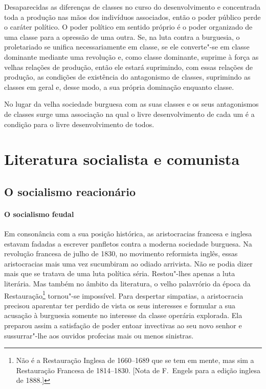 Desaparecidas as diferenças de classes no curso do desenvolvimento e
concentrada toda a produção nas mãos dos indivíduos associados, então o
poder público perde o caráter político. O poder político em sentido
próprio é o poder organizado de uma classe para a opressão de uma
outra. Se, na luta contra a burguesia, o proletariado se unifica
necessariamente em classe, se ele converte"-se em classe dominante
mediante uma revolução e, como classe dominante, suprime à força as
velhas relações de produção, então ele estará suprimindo, com essas
relações de produção, as condições de existência do antagonismo de
classes, suprimindo as classes em geral e, desse modo, a sua própria
dominação enquanto classe.

No lugar da velha sociedade burguesa com as suas classes e os seus
antagonismos de classes surge uma associação na qual o livre
desenvolvimento de cada um é a condição para o livre desenvolvimento de
todos.

\section{Literatura socialista e comunista}

\subsection{O socialismo reacionário}

\paragraph{O socialismo feudal}
Em consonância com a sua posição histórica, as aristocracias
francesa e inglesa estavam fadadas a escrever panfletos contra a
moderna sociedade burguesa. Na revolução francesa de julho de 1830, no
movimento reformista inglês, essas aristocracias mais uma vez				
sucumbiram ao odiado arrivista. Não se podia dizer mais que se tratava
de uma luta política séria. Restou"-lhes apenas a luta literária. Mas
também no âmbito da literatura, o velho palavrório da época da
Restauração\footnote{ Não é a Restauração Inglesa de 1660--1689 que se tem em mente, mas sim a
Restauração Francesa de 1814--1830. [Nota de F.~Engels para a edição
inglesa de 1888.]}
tornou"-se impossível. Para despertar simpatias, a
aristocracia precisou aparentar ter perdido de vista os seus interesses
e formular a sua acusação à burguesia somente no interesse da
classe operária explorada. Ela preparou assim a satisfação de
poder entoar invectivas ao seu novo senhor e sussurrar"-lhe aos
ouvidos profecias mais ou menos sinistras.

